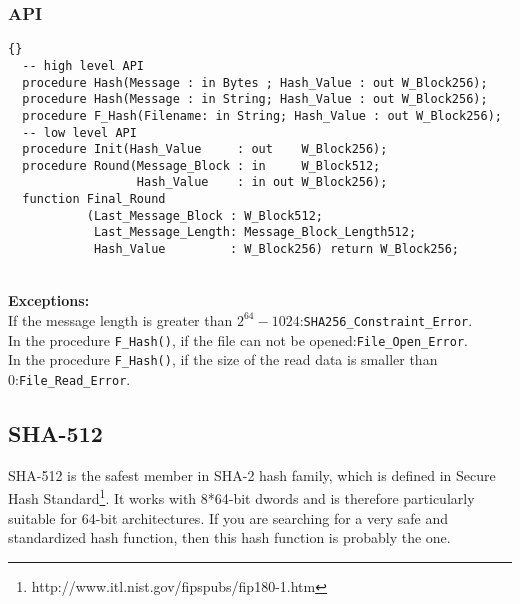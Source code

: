 \subsubsection*{API}
\begin{lstlisting}{}
  -- high level API
  procedure Hash(Message : in Bytes ; Hash_Value : out W_Block256);
  procedure Hash(Message : in String; Hash_Value : out W_Block256); 
  procedure F_Hash(Filename: in String; Hash_Value : out W_Block256);
  -- low level API
  procedure Init(Hash_Value     : out    W_Block256); 
  procedure Round(Message_Block : in     W_Block512;
                  Hash_Value    : in out W_Block256);
  function Final_Round
           (Last_Message_Block : W_Block512;
            Last_Message_Length: Message_Block_Length512;
            Hash_Value         : W_Block256) return W_Block256;
\end{lstlisting}\\ 
\textbf{Exceptions:}\\
If the message length is greater than $2^{64}-1024$:\quad \texttt{SHA256\_Constraint\_Error}.\\ 
In the procedure \texttt{F\_Hash()}, if the file can not be opened:\quad\texttt{File\_Open\_Error}.\\
In the procedure \texttt{F\_Hash()}, if the size of the read data is smaller than 0:\quad\texttt{File\_Read\_Error}.\\
\subsection{SHA-512}
SHA-512 is the safest member in SHA-2 hash family, which is defined in Secure Hash Standard\footnote{http://www.itl.nist.gov/fipspubs/fip180-1.htm}. It works with 8*64-bit dwords and is therefore particularly suitable for 64-bit architectures. If you are searching for a very safe and standardized hash function, then this hash function is probably the one.
